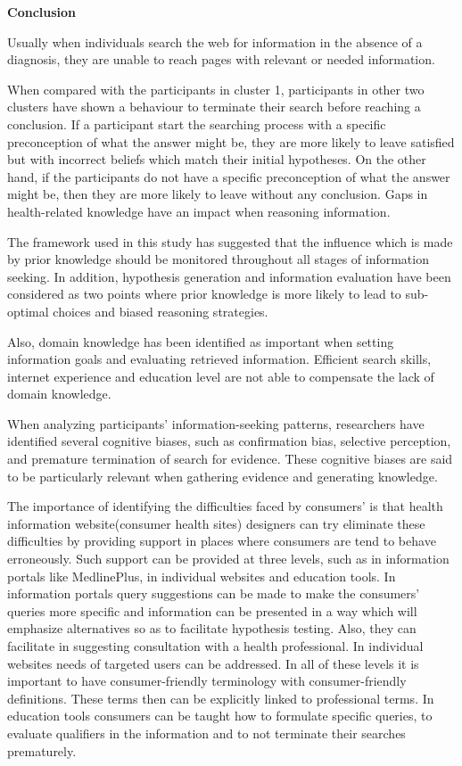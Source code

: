 \documentclass[]{article}
\begin{document}
\textbf{Conclusion}

Usually when individuals search the web for information in the absence of a diagnosis, they are unable to reach pages with relevant or needed information. 

When compared with the participants in cluster 1, participants in other two clusters have shown a behaviour to terminate their search before reaching a conclusion.  If a participant start the searching process with a specific preconception of what the answer might be, they are more likely to leave satisfied but with incorrect beliefs which match their initial hypotheses. On the other hand, if the participants do not have a specific preconception of what the answer might be, then they are more likely to leave without any conclusion.   
Gaps in health-related knowledge have an impact when reasoning information. 

The framework used in this study has suggested that the influence which is made by prior knowledge should be monitored throughout all stages of information seeking. In addition, hypothesis generation and information evaluation have been considered as two points where prior knowledge is more likely to lead to sub-optimal choices and biased reasoning strategies. 

Also, domain knowledge has been identified as important when setting information goals and evaluating retrieved information. Efficient search skills, internet experience and education level are not able to compensate the lack of domain knowledge. 

When analyzing participants’ information-seeking patterns, researchers have identified several cognitive biases, such as confirmation bias, selective perception, and premature termination of search for evidence. These cognitive biases are said to be particularly relevant when gathering evidence and generating knowledge.  

The importance of identifying the difficulties faced by consumers’ is that health information website(consumer health sites) designers can try eliminate these difficulties by providing support in places where consumers are tend to behave erroneously. Such support can be provided at three levels, such as in information portals like MedlinePlus, in individual websites and education tools. In information portals query suggestions can be made to make the consumers’ queries more specific and information can be presented in a way which will emphasize alternatives so as to facilitate hypothesis testing. Also, they can facilitate in suggesting consultation with a health professional. In individual websites needs of targeted users can be addressed. In all of these levels it is important to have consumer-friendly terminology with consumer-friendly definitions. These terms then can be explicitly linked to professional terms. In education tools consumers can be taught how to formulate specific queries, to evaluate qualifiers in the information and to not terminate their searches prematurely. 
\end{document}
